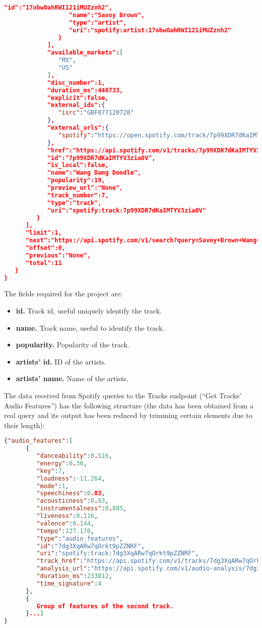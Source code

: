 \begin{lstlisting}[language=json,firstnumber=1]
                  "id":"17obwOahRWI121iMUZznh2",
                  "name":"Savoy Brown",
                  "type":"artist",
                  "uri":"spotify:artist:17obwOahRWI121iMUZznh2"
               }
            ],
            "available_markets":[
               "MX",
               "US"
            ],
            "disc_number":1,
            "duration_ms":440733,
            "explicit":false,
            "external_ids":{
               "isrc":"GBF077120720"
            },
            "external_urls":{
               "spotify":"https://open.spotify.com/track/7p99XDR7dKaIMTYV3zia0V"
            },
            "href":"https://api.spotify.com/v1/tracks/7p99XDR7dKaIMTYV3zia0V",
            "id":"7p99XDR7dKaIMTYV3zia0V",
            "is_local":false,
            "name":"Wang Dang Doodle",
            "popularity":19,
            "preview_url":"None",
            "track_number":7,
            "type":"track",
            "uri":"spotify:track:7p99XDR7dKaIMTYV3zia0V"
         }
      ],
      "limit":1,
      "next":"https://api.spotify.com/v1/search?query=Savoy+Brown+Wang+Dang+Doodle+&type=track&offset=1&limit=1",
      "offset":0,
      "previous":"None",
      "total":11
   }
}
\end{lstlisting}

\nonzeroparskip The fields required for the project are:
\begin{itemize}
	\item \textbf{id.} Track id, useful uniquely identify the track.
	\item \textbf{name.} Track name, useful to identify the track.
	\item \textbf{popularity.} Popularity of the track.
	\item \textbf{artists' id.} ID of the artists.
	\item \textbf{artists' name.} Name of the artists.
\end{itemize}

\nonzeroparskip The data received from Spotify queries to the Tracks endpoint (``Get Tracks' Audio Features'') has the following structure (the data has been obtained from a real query and its output has been reduced by trimming certain elements due to their length):
\begin{lstlisting}[language=json,firstnumber=1]
{"audio_features":[
      {
         "danceability":0.516,
         "energy":0.36,
         "key":7,
         "loudness":-11.264,
         "mode":1,
         "speechiness":0.03,
         "acousticness":0.83,
         "instrumentalness":0.885,
         "liveness":0.116,
         "valence":0.144,
         "tempo":127.176,
         "type":"audio_features",
         "id":"7dg3XqARw7qOrkt9pZZNRF",
         "uri":"spotify:track:7dg3XqARw7qOrkt9pZZNRF",
         "track_href":"https://api.spotify.com/v1/tracks/7dg3XqARw7qOrkt9pZZNRF",
         "analysis_url":"https://api.spotify.com/v1/audio-analysis/7dg3XqARw7qOrkt9pZZNRF",
         "duration_ms":233812,
         "time_signature":4
      },
      {
         Group of features of the second track.
      }...]
}
\end{lstlisting}

